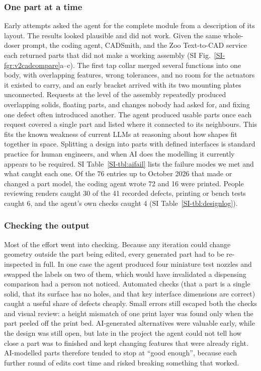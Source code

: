 \documentclass[twoside,twocolumn,9pt]{article}
\newcommand{\siref}[1]{\ref*{SI-#1}}
\begin{document}
\subsubsection{One part at a time}
Early attempts asked the agent for the complete module from a description of its layout. The results looked plausible and did not work. Given the same whole-doser prompt, the coding agent, CADSmith, and the Zoo Text-to-CAD service each returned parts that did not make a working assembly (SI Fig.~\siref{fgr:v2cadcompare}a--c). The first tap collar merged several functions into one body, with overlapping features, wrong tolerances, and no room for the actuators it existed to carry, and an early bracket arrived with its two mounting plates unconnected. Requests at the level of the assembly repeatedly produced overlapping solids, floating parts, and changes nobody had asked for, and fixing one defect often introduced another. The agent produced usable parts once each request covered a single part and listed where it connected to its neighbours. This fits the known weakness of current LLMs at reasoning about how shapes fit together in space.\cite{Alrashedy2025Generating} Splitting a design into parts with defined interfaces is standard practice for human engineers, and when AI does the modelling it currently appears to be required. SI Table~\siref{tbl:aifail} lists the failure modes we met and what caught each one. Of the 76 entries up to October 2026 that made or changed a part model, the coding agent wrote 72 and 16 were printed. People reviewing renders caught 30 of the 41 recorded defects, printing or bench tests caught 6, and the agent's own checks caught 4 (SI Table~\siref{tbl:designlog}).

\subsubsection{Checking the output}
Most of the effort went into checking. Because any iteration could change geometry outside the part being edited, every generated part had to be re-inspected in full. In one case the agent produced four miniature test nozzles and swapped the labels on two of them, which would have invalidated a dispensing comparison had a person not noticed. Automated checks (that a part is a single solid, that its surface has no holes, and that key interface dimensions are correct) caught a useful share of defects cheaply. Small errors still escaped both the checks and visual review: a height mismatch of one print layer was found only when the part peeled off the print bed. AI-generated alternatives were valuable early, while the design was still open, but late in the project the agent could not tell how close a part was to finished and kept changing features that were already right. AI-modelled parts therefore tended to stop at ``good enough'', because each further round of edits cost time and risked breaking something that worked.
\end{document}

